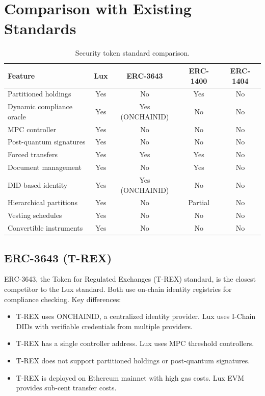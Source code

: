 \documentclass[11pt,a4paper]{article}
\begin{document}
\section{Comparison with Existing Standards}\label{sec:comparison}

\begin{table}[H]
\centering
\caption{Security token standard comparison.}
\label{tab:standard-comparison}
\begin{tabular}{lcccc}
\toprule
\textbf{Feature} & \textbf{Lux} & \textbf{ERC-3643} & \textbf{ERC-1400} & \textbf{ERC-1404} \\
\midrule
Partitioned holdings & Yes & No & Yes & No \\
Dynamic compliance oracle & Yes & Yes (ONCHAINID) & No & No \\
MPC controller & Yes & No & No & No \\
Post-quantum signatures & Yes & No & No & No \\
Forced transfers & Yes & Yes & Yes & No \\
Document management & Yes & No & Yes & No \\
DID-based identity & Yes & Yes (ONCHAINID) & No & No \\
Hierarchical partitions & Yes & No & Partial & No \\
Vesting schedules & Yes & No & No & No \\
Convertible instruments & Yes & No & No & No \\
\bottomrule
\end{tabular}
\end{table}

\subsection{ERC-3643 (T-REX)}

ERC-3643, the Token for Regulated Exchanges (T-REX) standard, is the closest competitor to the Lux standard. Both use on-chain identity registries for compliance checking. Key differences:

\begin{itemize}[nosep]
  \item T-REX uses ONCHAINID, a centralized identity provider. Lux uses I-Chain DIDs with verifiable credentials from multiple providers.
  \item T-REX has a single controller address. Lux uses MPC threshold controllers.
  \item T-REX does not support partitioned holdings or post-quantum signatures.
  \item T-REX is deployed on Ethereum mainnet with high gas costs. Lux EVM provides sub-cent transfer costs.
\end{itemize}
\end{document}
